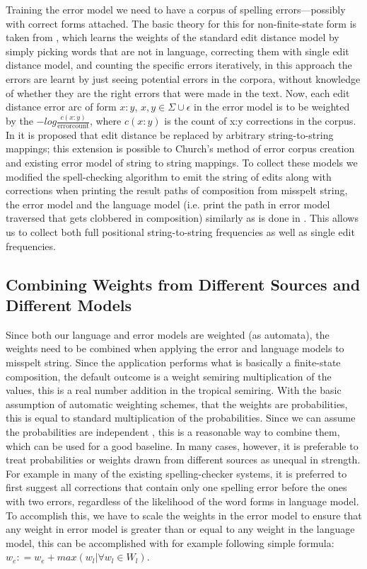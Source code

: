 \documentclass[a4paper,12pt]{article}
\begin{document}
Training the error model we need to have a corpus of spelling errors---possibly
with correct forms attached. The basic theory for this for non-finite-state
form is taken from \cite{church1991probability}, which learns the weights of
the standard edit distance model by simply picking words that are not in
language, correcting them with single edit distance model, and counting the
specific errors iteratively, in this approach the errors are learnt by just
seeing potential errors in the corpora, without knowledge of whether they are
the right errors that were made in the text.  Now, each edit distance error arc
of form $x:y$, $x, y \in \Sigma \cup {\epsilon}$ in the error model is to be
weighted by the $-log \frac{c(x:y)}{\mathrm{error count}}$, where $c(x:y)$ is
the count of x:y corrections in the corpus. In \cite{brill2000improved} it is
proposed that edit distance be replaced by arbitrary string-to-string mappings;
this extension is possible to Church's method of error corpus creation and
existing error model of string to string mappings. To collect these models we
modified the spell-checking algorithm to emit the string of edits along with
corrections when printing the result paths of composition from misspelt string,
the error model and the language model (i.e. print the path in error model
traversed that gets clobbered in composition) similarly as is done in
\cite{ristad1998learning}.  This allows us to collect both full positional
string-to-string frequencies as well as single edit frequencies.

\subsection{Combining Weights from Different Sources and Different Models}
\label{subsec:combining-weights}

Since both our language and error models are weighted (as automata), the
weights need to be combined when applying the error and language models to
misspelt string. Since the application performs what is basically a
finite-state composition, the default outcome is a weight semiring
multiplication of the values, this is a real number addition in the tropical
semiring. With the basic assumption of automatic weighting schemes, that the
weights are probabilities, this is equal to standard multiplication of the
probabilities. Since we can assume the probabilities are independent
\cite[]{church1991probability}, this is a reasonable way to combine them, which
can be used for a good baseline. In many cases, however, it is preferable to
treat probabilities or weights drawn from different sources as unequal in
strength. For example in many of the existing spelling-checker systems, it is
preferred to first suggest all corrections that contain only one spelling error
before the ones with two errors, regardless of the likelihood of the word forms
in language model. To accomplish this, we have to scale the weights in the
error model to ensure that any weight in error model is greater than or equal
to any weight in the language model, this can be accomplished with for example
following simple formula: $w_e \mathrel{\mathop:}= w_e + max(w_l | \forall w_l
\in W_l)$.
\end{document}
